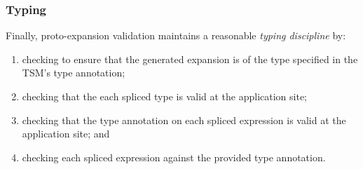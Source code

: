 \documentclass[acmlarge,review,anonymous]{acmart}\settopmatter{printfolios=true}
\newcommand{\li}[1]{\lstinline{#1}}
\begin{document}

\subsubsection{Typing}
Finally, proto-expansion validation maintains a reasonable \emph{typing discipline} by:
\begin{enumerate}
\item checking to ensure that the generated expansion is of the type specified in the TSM's type annotation; %
\item checking that the each spliced type is valid at the application site; 
\item checking that the type annotation on each spliced expression is valid at the application site; and 
\item checking each spliced expression against the provided type annotation.
\end{enumerate}

\end{document}
